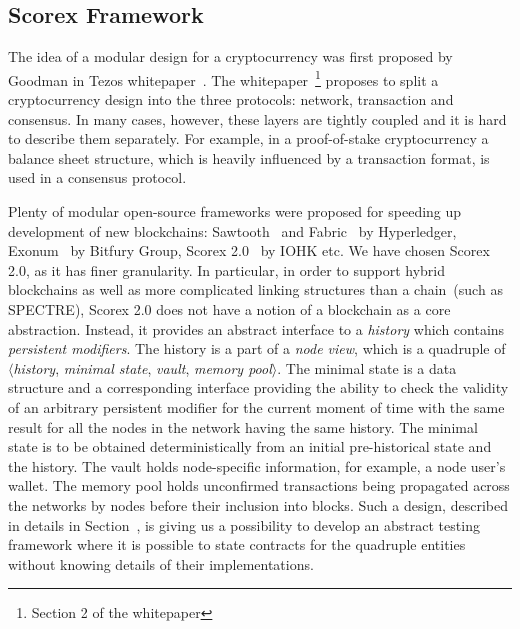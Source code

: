
\subsection{Scorex Framework}

The idea of a modular design for a cryptocurrency was first proposed by Goodman in Tezos whitepaper~\cite{goodmantezos}. The whitepaper~\footnote{Section 2 of the whitepaper} proposes to split a cryptocurrency design into the three protocols: network, transaction and consensus. In many cases, however, these layers are tightly coupled and it is hard to describe them separately. For example, in a proof-of-stake cryptocurrency a balance sheet structure, which is heavily influenced by a transaction format, is used in a consensus protocol. 

Plenty of modular open-source frameworks were proposed for speeding up development of new blockchains: Sawtooth~\cite{sawtooth} and Fabric~\cite{fabric} by Hyperledger, Exonum~\cite{exonum} by Bitfury Group, Scorex 2.0~\cite{scorex} by IOHK etc. We have chosen Scorex 2.0, as it has finer granularity. In particular, in order to support hybrid blockchains as well as more complicated linking structures than a chain~(such as SPECTRE\cite{EPRINT:SomLewZoh16}), Scorex 2.0 does not have a notion of a blockchain as a core abstraction. Instead, it provides an abstract interface to a \textit{history} which contains \textit{persistent modifiers}. The history is a part of a \textit{node view}, which is a quadruple of $\langle$\textit{history}, \textit{minimal state}, \textit{vault}, \textit{memory pool}$\rangle$. The minimal state is a data structure and a corresponding interface providing the ability to check the validity of an arbitrary persistent modifier for the current moment of time with the same result for all the nodes in the network having the same history. The minimal state is to be obtained deterministically from an initial pre-historical state and the history. The vault holds node-specific information, for example, a node user's wallet. The memory pool holds unconfirmed transactions being propagated across the networks by nodes before their inclusion into blocks. Such a design, described in details in Section~, is giving us a possibility to develop an abstract testing framework where it is possible to state contracts for the quadruple entities without knowing details of their implementations.